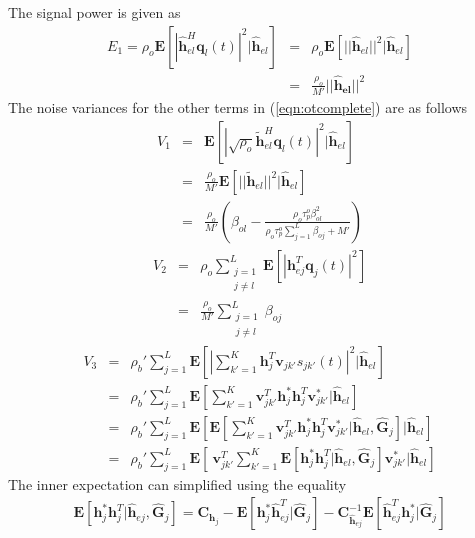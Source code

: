 \documentclass[10pt, a4paper, twoside,fleqn]{article}
\begin{document}
The signal power is given as
\begin{eqnarray}
E_1 = \rho_o\pmb{E}[|\pmb{\hat h}_{el}^H \pmb{q}_l(t)|^2 | \pmb{\hat h}_{el}] &=& \rho_o\pmb{E}[||\pmb{\hat h}_{el}||^2 | \pmb{\hat h}_{el}] \nonumber \\     &=& \frac{\rho_o}{M'} ||\pmb{\hat h_{el}}||^2
\end{eqnarray}
The noise variances for the other terms in (\ref{eqn:otcomplete}) are as follows
\begin{eqnarray}\label{eqn:otv1}
	V_1 &=& \pmb{E}[|\sqrt{\rho_o}\pmb{\widetilde{h}}_{el}^H \pmb{q}_l(t)|^2|\pmb{\hat h}_{el}] \nonumber \\
            &=& \frac{\rho_o}{M'} \pmb{E}[||\pmb{\widetilde{h}}_{el}||^2 |\pmb{\hat h}_{el}] \nonumber \\
            &=& \frac{\rho_o}{M'}\left(\beta_{ol}-\frac{\rho_o\tau_p^o\beta^2_{ol}}{\rho_o\tau_p^o\sum\limits_{j=1}^{L}\beta_{oj}+M'}\right)          
\end{eqnarray}
\begin{eqnarray}\label{eqn:otv2}
	V_2 &=& \rho_o \sum_{\substack{j=1 \\ j \neq l}}^{L} \pmb{E}[|\pmb{h}^T_{ej} \pmb{q}_j(t)|^2] \nonumber \\
            &=& \frac{\rho_o}{M'} \sum_{\substack{j=1 \\ j\neq l}}^{L} \beta_{oj}
\end{eqnarray}
\begin{eqnarray}
	V_3 &=& \rho_b' \sum_{j=1}^{L} \pmb{E}\left[\left|\sum_{k'=1}^{K} \pmb{h}^T_j \pmb{v}_{jk'}s_{jk'}(t) \right|^2 | \pmb{\hat h}_{el} \right] \nonumber \\
            &=& \rho_b' \sum_{j=1}^{L} \pmb{E}\left[\sum_{k'=1}^{K} \pmb{v}_{jk'}^T \pmb{h}_j^*  \pmb{h}_j^T \pmb{v}_{jk'}^*| \pmb{\hat h}_{el} \right] \nonumber \\
            &=& \rho_b' \sum_{j=1}^{L} \pmb{E}\left[\pmb{E}\left[\sum_{k'=1}^{K} \pmb{v}^T_{jk'} \pmb{h}_j^*  \pmb{h}_j^T \pmb{v}_{jk'}^*| \pmb{\hat h}_{el},  \pmb{\hat G}_{j} \right] | \pmb{\hat h}_{el}\right] \nonumber \\
            &=& \rho_b' \sum_{j=1}^{L} \pmb{E}\left[\ \pmb{v}^T_{jk'}\sum_{k'=1}^{K} \pmb{E}\left[ \pmb{h}_j^*  \pmb{h}^T_j | \pmb{\hat h}_{el},  \pmb{\hat G}_{j} \right] \pmb{v}_{jk'}^*| \pmb{\hat h}_{el}\right]
\end{eqnarray}
The inner expectation can simplified using the equality \cite{bib:rmtBook}
\begin{eqnarray}
	\pmb{E}[\pmb{h}_j^*\pmb{h}^T_j|\pmb{\hat h}_{ej}, \pmb{\hat G}_{j}] = \pmb{C}_{\pmb{h}_j}-\pmb{E}[\pmb{h}_j^* \pmb{\hat h}^T_{ej}| \pmb{\hat G}_{j}] - \pmb{C}_{\pmb{\hat h}_{ej}}^{-1}\pmb{E}[\pmb{\hat h}_{ej}^T \pmb{h}_j^*| \pmb{\hat G}_{j}]
\end{eqnarray}
\end{document}
